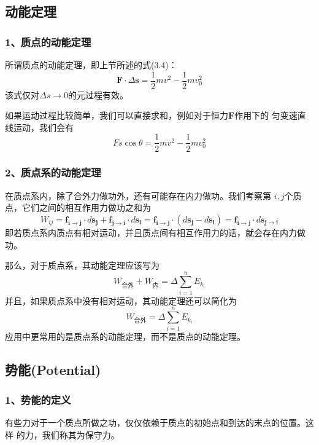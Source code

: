 \subsection{动能定理}
\subsubsection*{1、质点的动能定理}
所谓质点的动能定理，即上节所述的式(3.4)：
\begin{equation}
    \boldsymbol{F}\cdot \Delta \boldsymbol{s}=\frac{1}{2}mv^2-\frac{1}{2}mv_0^2
\end{equation}
该式仅对$\Delta s\to 0$的元过程有效。

如果运动过程比较简单，我们可以直接求和，例如对于恒力$\boldsymbol{F}$作用下的
匀变速直线运动，我们会有
\begin{equation}
    Fs\cos\theta=\frac{1}{2}mv^2-\frac{1}{2}mv_0^2
\end{equation}
\subsubsection*{2、质点系的动能定理}
在质点系内，除了合外力做功外，还有可能存在内力做功。我们考察第
$i,j$个质点，它们之间的相互作用力做功之和为
\begin{equation}
    W_{ij}=\boldsymbol{f_{i\rightarrow j}}\cdot d\boldsymbol{s_j}+
    \boldsymbol{f_{j\rightarrow i}}\cdot d\boldsymbol{s_i}=
    \boldsymbol{f_{i\rightarrow j}}\cdot \left(d\boldsymbol{s_j}
    -d\boldsymbol{s_i}\right)=\boldsymbol{f_{i\rightarrow j}}\cdot 
    d\boldsymbol{s_{j\rightarrow i}}
\end{equation}
即若质点系内质点有相对运动，并且质点间有相互作用力的话，就会存在内力做功。

那么，对于质点系，其动能定理应该写为
\begin{equation}
    W_{\text{合外}}+W_{\text{内}}=\Delta \sum_{i=1}^{n} E_{k_i}
\end{equation}
并且，如果质点系中没有相对运动，其动能定理还可以简化为
\begin{equation}
    W_{\text{合外}}=\Delta \sum_{i=1}^{n} E_{k_i}
\end{equation}
应用中更常用的是质点系的动能定理，而不是质点的动能定理。
\subsection{势能(Potential)}
\subsubsection*{1、势能的定义}
有些力对于一个质点所做之功，仅仅依赖于质点的初始点和到达的末点的位置。这样
的力，我们称其为保守力。

